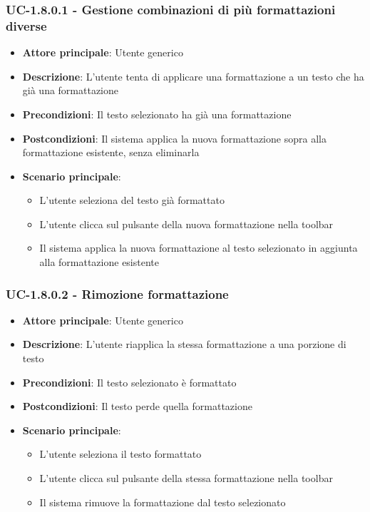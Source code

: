 \documentclass[11pt,a4paper]{article}
\begin{document}
\subsubsection{UC-1.8.0.1 - Gestione combinazioni di più formattazioni diverse}
\begin{itemize}
    \item \textbf{Attore principale}: Utente generico
    \item \textbf{Descrizione}: L'utente tenta di applicare una formattazione a un testo che ha già una formattazione
    \item \textbf{Precondizioni}: Il testo selezionato ha già una formattazione
    \item \textbf{Postcondizioni}: Il sistema applica la nuova formattazione sopra alla formattazione esistente, senza eliminarla
    \item \textbf{Scenario principale}:
        \begin{itemize}
            \item L'utente seleziona del testo già formattato
            \item L'utente clicca sul pulsante della nuova formattazione nella toolbar
            \item Il sistema applica la nuova formattazione al testo selezionato in aggiunta alla formattazione esistente
        \end{itemize}
\end{itemize}

\subsubsection{UC-1.8.0.2 - Rimozione formattazione}
\begin{itemize}
    \item \textbf{Attore principale}: Utente generico
    \item \textbf{Descrizione}: L'utente riapplica la stessa formattazione a una porzione di testo
    \item \textbf{Precondizioni}: Il testo selezionato è formattato
    \item \textbf{Postcondizioni}: Il testo perde quella formattazione
    \item \textbf{Scenario principale}:
        \begin{itemize}
            \item L'utente seleziona il testo formattato
            \item L'utente clicca sul pulsante della stessa formattazione nella toolbar
            \item Il sistema rimuove la formattazione dal testo selezionato
        \end{itemize}
\end{itemize}
\end{document}
